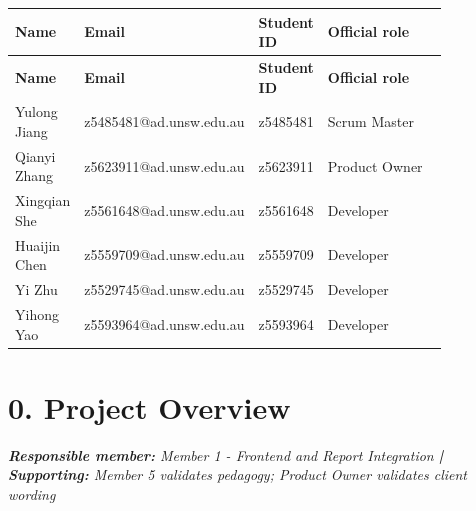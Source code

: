 \documentclass[11pt,a4paper]{article}
\begin{document}
\begin{small}

\setlength{\tabcolsep}{8pt}

\begin{longtable}{>{\raggedright\arraybackslash}p{0.15\linewidth}>{\raggedright\arraybackslash}p{0.28\linewidth}>{\raggedright\arraybackslash}p{0.15\linewidth}>{\raggedright\arraybackslash}p{0.28\linewidth}}

\hline

\textbf{Name} & \textbf{Email} & \textbf{Student ID} & \textbf{Official role} \\ \hline

\endfirsthead

\hline

\textbf{Name} & \textbf{Email} & \textbf{Student ID} & \textbf{Official role} \\ \hline

\endhead

Yulong Jiang & z5485481@ad.unsw.edu.au & z5485481 & Scrum Master \\ \hline

Qianyi Zhang & z5623911@ad.unsw.edu.au & z5623911 & Product Owner \\ \hline

Xingqian She & z5561648@ad.unsw.edu.au & z5561648 & Developer \\ \hline

Huaijin Chen & z5559709@ad.unsw.edu.au & z5559709 & Developer \\ \hline

Yi Zhu & z5529745@ad.unsw.edu.au & z5529745 & Developer \\ \hline

Yihong Yao & z5593964@ad.unsw.edu.au & z5593964 & Developer \\ \hline

\end{longtable}

\end{small}

\clearpage

\tableofcontents

\clearpage

\section*{0. Project Overview}


\noindent\textit{\textbf{Responsible member: }Member 1 - Frontend and Report Integration\textbf{ | Supporting: }Member 5 validates pedagogy; Product Owner validates client wording}\par
\end{document}
